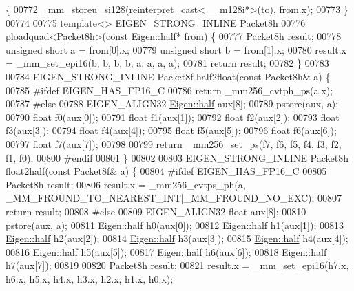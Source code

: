 \begin{DoxyCode}
      \{
00772   \_mm\_storeu\_si128(reinterpret\_cast<\_\_m128i*>(to), from.x);
00773 \}
00774 
00775 \textcolor{keyword}{template}<> EIGEN\_STRONG\_INLINE Packet8h
00776 ploadquad<Packet8h>(\textcolor{keyword}{const} \hyperlink{struct_eigen_1_1half}{Eigen::half}* from) \{
00777   Packet8h result;
00778   \textcolor{keywordtype}{unsigned} \textcolor{keywordtype}{short} a = from[0].x;
00779   \textcolor{keywordtype}{unsigned} \textcolor{keywordtype}{short} b = from[1].x;
00780   result.x = \_mm\_set\_epi16(b, b, b, b, a, a, a, a);
00781   \textcolor{keywordflow}{return} result;
00782 \}
00783 
00784 EIGEN\_STRONG\_INLINE Packet8f half2float(\textcolor{keyword}{const} Packet8h& a) \{
00785 \textcolor{preprocessor}{#ifdef EIGEN\_HAS\_FP16\_C}
00786   \textcolor{keywordflow}{return} \_mm256\_cvtph\_ps(a.x);
00787 \textcolor{preprocessor}{#else}
00788   EIGEN\_ALIGN32 \hyperlink{struct_eigen_1_1half}{Eigen::half} aux[8];
00789   pstore(aux, a);
00790   \textcolor{keywordtype}{float} f0(aux[0]);
00791   \textcolor{keywordtype}{float} f1(aux[1]);
00792   \textcolor{keywordtype}{float} f2(aux[2]);
00793   \textcolor{keywordtype}{float} f3(aux[3]);
00794   \textcolor{keywordtype}{float} f4(aux[4]);
00795   \textcolor{keywordtype}{float} f5(aux[5]);
00796   \textcolor{keywordtype}{float} f6(aux[6]);
00797   \textcolor{keywordtype}{float} f7(aux[7]);
00798 
00799   \textcolor{keywordflow}{return} \_mm256\_set\_ps(f7, f6, f5, f4, f3, f2, f1, f0);
00800 \textcolor{preprocessor}{#endif}
00801 \}
00802 
00803 EIGEN\_STRONG\_INLINE Packet8h float2half(\textcolor{keyword}{const} Packet8f& a) \{
00804 \textcolor{preprocessor}{#ifdef EIGEN\_HAS\_FP16\_C}
00805   Packet8h result;
00806   result.x = \_mm256\_cvtps\_ph(a, \_MM\_FROUND\_TO\_NEAREST\_INT|\_MM\_FROUND\_NO\_EXC);
00807   \textcolor{keywordflow}{return} result;
00808 \textcolor{preprocessor}{#else}
00809   EIGEN\_ALIGN32 \textcolor{keywordtype}{float} aux[8];
00810   pstore(aux, a);
00811   \hyperlink{struct_eigen_1_1half}{Eigen::half} h0(aux[0]);
00812   \hyperlink{struct_eigen_1_1half}{Eigen::half} h1(aux[1]);
00813   \hyperlink{struct_eigen_1_1half}{Eigen::half} h2(aux[2]);
00814   \hyperlink{struct_eigen_1_1half}{Eigen::half} h3(aux[3]);
00815   \hyperlink{struct_eigen_1_1half}{Eigen::half} h4(aux[4]);
00816   \hyperlink{struct_eigen_1_1half}{Eigen::half} h5(aux[5]);
00817   \hyperlink{struct_eigen_1_1half}{Eigen::half} h6(aux[6]);
00818   \hyperlink{struct_eigen_1_1half}{Eigen::half} h7(aux[7]);
00819 
00820   Packet8h result;
00821   result.x = \_mm\_set\_epi16(h7.x, h6.x, h5.x, h4.x, h3.x, h2.x, h1.x, h0.x);

\end{DoxyCode}
